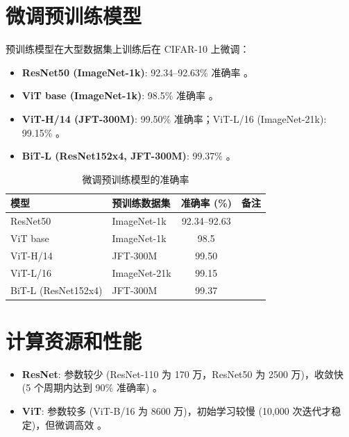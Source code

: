 \documentclass[UTF8]{report}
\theoremstyle{MyLineTheoremStyle} %
\theoremstyle{MyBlockTheoremStyle} %
\theoremstyle{MySubsubsectionStyle} %
\begin{document}
\section*{微调预训练模型}
预训练模型在大型数据集上训练后在 CIFAR-10 上微调：
\begin{itemize}
    \item \textbf{ResNet50 (ImageNet-1k)}: 92.34–92.63\% 准确率 \cite{sidthoviti}。
    \item \textbf{ViT base (ImageNet-1k)}: 98.5\% 准确率 \cite{kentaroy47vit}。
    \item \textbf{ViT-H/14 (JFT-300M)}: 99.50\% 准确率；ViT-L/16 (ImageNet-21k): 99.15\% \cite{dosovitskiy2020image}。
    \item \textbf{BiT-L (ResNet152x4, JFT-300M)}: 99.37\% \cite{dosovitskiy2020image}。
\end{itemize}

\begin{table}[h]
\centering
\caption{微调预训练模型的准确率}
\begin{tabular}{llcc}
\toprule
模型 & 预训练数据集 & 准确率 (\%) & 备注 \\
\midrule
ResNet50 & ImageNet-1k & 92.34–92.63 & \cite{sidthoviti} \\
ViT base & ImageNet-1k & 98.5 & \cite{kentaroy47vit} \\
ViT-H/14 & JFT-300M & 99.50 & \cite{dosovitskiy2020image} \\
ViT-L/16 & ImageNet-21k & 99.15 & \cite{dosovitskiy2020image} \\
BiT-L (ResNet152x4) & JFT-300M & 99.37 & \cite{dosovitskiy2020image} \\
\bottomrule
\end{tabular}
\end{table}

\section*{计算资源和性能}
\begin{itemize}
    \item \textbf{ResNet}: 参数较少 (ResNet-110 为 170 万，ResNet50 为 2500 万)，收敛快 (5 个周期内达到 90\% 准确率) \cite{pytorchforum}。
    \item \textbf{ViT}: 参数较多 (ViT-B/16 为 8600 万)，初始学习较慢 (10,000 次迭代才稳定)，但微调高效 \cite{lightningvit, dosovitskiy2020image}。
\end{itemize}
\end{document}
